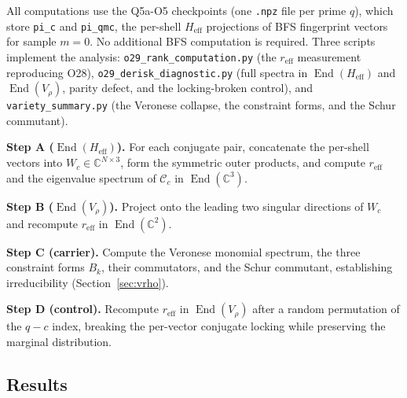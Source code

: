 \documentclass[12pt,a4paper]{article}
\theoremstyle{remark}
\DeclareMathOperator{\End}{End}
\newcommand{\Heff}{H_{\mathrm{eff}}}
\newcommand{\Vrho}{V_{\rho}}
\newcommand{\Cc}{\mathcal{C}_c}
\newcommand{\reff}{r_{\mathrm{eff}}}
\begin{document}
      All computations use the Q5a-O5 checkpoints (one \texttt{.npz} file per prime $q$), which store \texttt{pi\_c}
      and \texttt{pi\_qmc}, the per-shell $\Heff$ projections of BFS fingerprint vectors for sample $m = 0$.
      No additional BFS computation is required.
      Three scripts implement the analysis: \texttt{o29\_rank\_computation.py} (the $\reff$ measurement reproducing
      O28), \texttt{o29\_derisk\_diagnostic.py} (full spectra in $\End(\Heff)$ and $\End(\Vrho)$, parity defect, and
      the locking-broken control), and \texttt{variety\_summary.py} (the Veronese collapse, the constraint forms, and
      the Schur commutant).

      \textbf{Step A ($\End(\Heff)$).}
      For each conjugate pair, concatenate the per-shell vectors into $W_c \in \mathbb{C}^{N \times 3}$, form the
      symmetric outer products, and compute $\reff$ and the eigenvalue spectrum of $\Cc$ in $\End(\mathbb{C}^3)$.

      \textbf{Step B ($\End(\Vrho)$).}
      Project onto the leading two singular directions of $W_c$ and recompute $\reff$ in $\End(\mathbb{C}^2)$.

      \textbf{Step C (carrier).}
      Compute the Veronese monomial spectrum, the three constraint forms $B_k$, their commutators, and the Schur
      commutant, establishing irreducibility (Section~\ref{sec:vrho}).

      \textbf{Step D (control).}
      Recompute $\reff$ in $\End(\Vrho)$ after a random permutation of the $q{-}c$ index, breaking the per-vector
      conjugate locking while preserving the marginal distribution.

    \subsection{Results}
\end{document}
